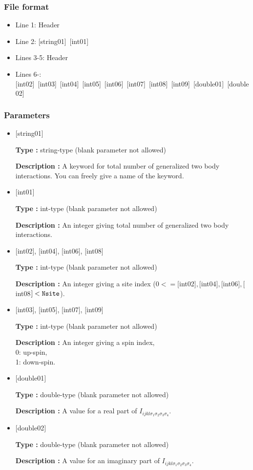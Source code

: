 \subsubsection{File format}
 \begin{itemize}
   \item  Line 1:  Header
   \item  Line 2:   [string01]~[int01]
   \item  Lines 3-5:  Header
   \item  Lines 6-:
   [int02]~[int03]~[int04]~[int05]~[int06]~[int07]~[int08]~[int09]~[double01]~[double02] 
  \end{itemize}
\subsubsection{Parameters}
 \begin{itemize}

   \item  $[$string01$]$
   
    {\bf Type :} string-type (blank parameter not allowed)

   {\bf Description :} A keyword for total number of generalized two body interactions. You can freely give a name of the keyword.

   \item  $[$int01$]$
   
    {\bf Type :} int-type (blank parameter not allowed)

   {\bf Description :} An integer giving total number of generalized two body interactions.

  \item  $[$int02$]$, $[$int04$]$, $[$int06$]$, $[$int08$]$

 {\bf Type :} int-type (blank parameter not allowed)

{\bf Description :} An integer giving a site index ($0<= [$int02$],  [$int04$], [$int06$], [$int08$]<\verb|Nsite|$).
 
  \item  $[$int03$]$, $[$int05$]$, $[$int07$]$, $[$int09$]$

 {\bf Type :} int-type (blank parameter not allowed)

{\bf Description :}  An integer giving a spin index,\\
0: up-spin,\\
1: down-spin.

 \item  $[$double01$]$
   
   {\bf Type :} double-type (blank parameter not allowed)

  {\bf Description :}  A value for a real part of $I_{ijkl\sigma_1\sigma_2\sigma_3\sigma_4}$.

 \item  $[$double02$]$
   
   {\bf Type :} double-type (blank parameter not allowed)

  {\bf Description :} A value for an imaginary part of $I_{ijkl\sigma_1\sigma_2\sigma_3\sigma_4}$.
\end{itemize}

